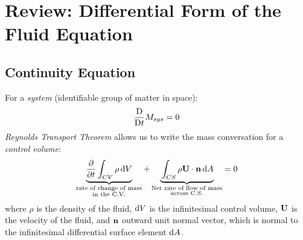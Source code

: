 \setcounter{chapter}{-1}
\chapter{Review: Differential Form of the Fluid Equation}

\section{Continuity Equation}

For a \emph{system} (identifiable group of matter in space):
%
\begin{equation}
  \frac{\mathop{}\!\mathrm{D}}{\mathop{}\!\mathrm{D} t}{M_{sys}} = 0
  \label{eq:mass-conversation}
\end{equation}
%
\emph{Reynolds Transport Theorem} allows us to write the mass conversation for a \emph{control volume}:
\begin{equation}
  \underbrace{\vphantom{\f{\p}{\rho}} \f{\p}{\p t} \int_{CV}{\rho \d V} }_{\substack{\text{rate of change of mass} \\ \text{in the C.V.}}}
  +
\underbrace{\vphantom{\f{\p}{\rho}}\int_{CS}{\rho \mb{U} \cdot \mb{n} \d A}}_{\substack{\text{Net rate of flow of mass} \\ \text{across C.S.}}}
  = 0
  \label{eq:reynolds-transport-theorem}
\end{equation}
%
where \(\rho\) is the density of the fluid, \(\mathop{}\!\mathrm{d} V\) is the infinitesimal control volume, \(\mathbf{U}\) is the velocity of the fluid, and \(\mathbf{n}\) outward unit normal vector, which is normal to the infinitesimal differential surface element \(\mathop{}\!\mathrm{d} A\).

